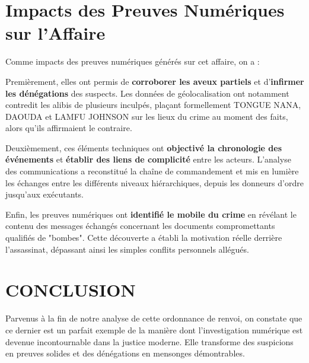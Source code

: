 \documentclass[12pt, a4paper]{article}
\begin{document}
\section{Impacts des Preuves Numériques sur l'Affaire}

Comme impacts des preuves numériques générés sur cet affaire, on a :

Premièrement, elles ont permis de \textbf{corroborer les aveux partiels} et d'\textbf{infirmer les dénégations} des suspects. Les données de géolocalisation ont notamment contredit les alibis de plusieurs inculpés, plaçant formellement TONGUE NANA, DAOUDA et LAMFU JOHNSON sur les lieux du crime au moment des faits, alors qu'ils affirmaient le contraire.

Deuxièmement, ces éléments techniques ont \textbf{objectivé la chronologie des événements} et \textbf{établir des liens de complicité} entre les acteurs. L'analyse des communications a reconstitué la chaîne de commandement et mis en lumière les échanges entre les différents niveaux hiérarchiques, depuis les donneurs d'ordre jusqu'aux exécutants.

Enfin, les preuves numériques ont \textbf{identifié le mobile du crime} en révélant le contenu des messages échangés concernant les documents compromettants qualifiés de "bombes". Cette découverte a établi la motivation réelle derrière l'assassinat, dépassant ainsi les simples conflits personnels allégués.
\newpage


\section*{CONCLUSION}
Parvenus à la fin de notre analyse de cette ordonnance de renvoi, on constate que ce dernier est un parfait exemple de la manière dont l'investigation numérique est devenue incontournable dans la justice moderne. Elle transforme des suspicions en preuves solides et des dénégations en mensonges démontrables.
\end{document}
